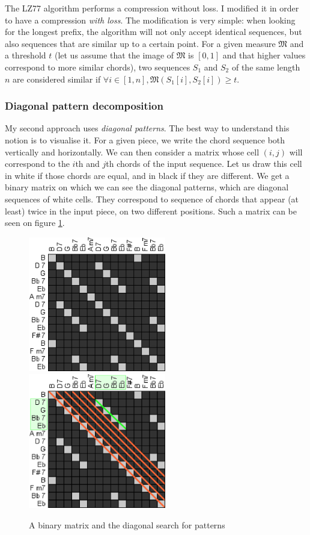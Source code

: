 \documentclass[a4paper,10pt]{article}
\begin{document}
The LZ77 algorithm performs a compression without loss. I modified it in order to have a compression \emph{with loss}. The modification is very simple: when looking for the longest prefix, the algorithm will not only accept identical sequences, but also sequences that are similar up to a certain point. For a given measure $\mathfrak{M}$ and a threshold $t$ (let us assume that the image of $\mathfrak{M}$ is $[0,1]$ and that higher values correspond to more similar chords), two sequences $S_1$ and $S_2$ of the same length $n$ are considered similar if $\forall i \in [1,n], \mathfrak{M}(S_1[i],S_2[i]) \geq t$.


\subsubsection{Diagonal pattern decomposition}

My second approach uses \emph{diagonal patterns}. The best way to understand this notion is to visualise it. For a given piece, we write the chord sequence both vertically and horizontally. We can then consider a matrix whose cell $(i,j)$ will correspond to the $i$th and $j$th chords of the input sequence. Let us draw this cell in white if those chords are equal, and in black if they are different. We get a binary matrix on which  we can see the diagonal patterns, which are diagonal sequences of white cells. They correspond to sequence of chords that appear (at least) twice in the input piece, on two different positions. Such a matrix can be seen on figure \ref{diagonals}.

\begin{figure}
\centering
\includegraphics[width=6cm]{images/diagonals1.jpg}\hspace{1cm}
\includegraphics[width=6cm]{images/diagonals2.jpg}
\caption{A binary matrix and the diagonal search for patterns\label{diagonals}}
\end{figure}
\end{document}
